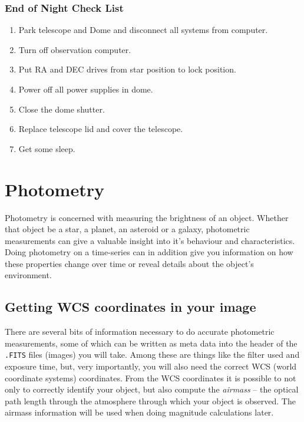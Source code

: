 \documentclass[12pt,twoside,a4paper]{report}
\begin{document}
\vspace{1.0cm}


\subsection{End of Night Check List}

\begin{enumerate}
 \item Park telescope and Dome and disconnect all systems from computer.
 \item Turn off observation computer.
 \item Put RA and DEC drives from star position to lock position.
 \item Power off all power supplies in dome.
 \item Close the dome shutter.

 \item Replace telescope lid and cover the telescope.
 \item Get some sleep.
\end{enumerate}




\chapter{Photometry}

Photometry is concerned with measuring the brightness of an object. Whether that object be a star, a planet, an asteroid or a galaxy, photometric measurements can give a valuable insight into it's behaviour and characteristics. Doing photometry on a time-series can in addition give you information on how these properties change over time or reveal details about the object's environment.\\



\section{Getting WCS coordinates in your image}

There are several bits of information necessary to do accurate photometric measurements, some of which can be written as meta data into the header of the {\tt .FITS} files (images) you will take. Among these are things like the filter used and exposure time, but, very importantly, you will also need the correct WCS (world coordinate systems) coordinates. From the WCS coordinates it is possible to not only to correctly identify your object, but also compute the \emph{airmass} -- the optical path length through the atmosphere through which your object is observed. The airmass information will be used when doing magnitude calculations later.\\
\end{document}
